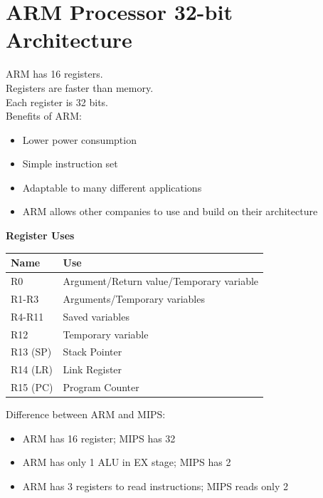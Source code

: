 \documentclass[12pt]{article}
\theoremstyle{definition}
\begin{document}
  \newpage
  \section{ARM Processor 32-bit Architecture}
  ARM has 16 registers. \\
  Registers are faster than memory. \\
  Each register is 32 bits. \\

  Benefits of ARM:
  \begin{itemize}
    \item Lower power consumption
    \item Simple instruction set
    \item Adaptable to many different applications
    \item ARM allows other companies to use and build on their architecture
  \end{itemize}

  \textbf{Register Uses}
  \begin{center}
  \begin{tabular}{|l|l|}
    \hline
    Name    & Use \\
    \hline
    R0      & Argument/Return value/Temporary variable \\
    \hline
    R1-R3   & Arguments/Temporary variables \\
    \hline
    R4-R11  & Saved variables \\
    \hline
    R12     & Temporary variable \\
    \hline
    R13 (SP)& Stack Pointer \\
    \hline
    R14 (LR)& Link Register \\
    \hline
    R15 (PC)& Program Counter \\
    \hline
  \end{tabular}
  \end{center}

  Difference between ARM and MIPS:
  \begin{itemize}
    \item ARM has 16 register; MIPS has 32
    \item ARM has only 1 ALU in EX stage; MIPS has 2
    \item ARM has 3 registers to read instructions; MIPS reads only 2
  \end{itemize}
\end{document}
